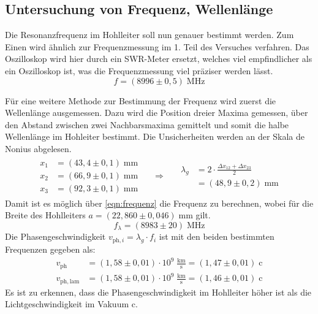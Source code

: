 \subsection{Untersuchung von Frequenz, Wellenlänge}
\label{sec:wellenlaenge}
    Die Resonanzfrequenz im Hohlleiter soll nun genauer bestimmt werden.
    Zum Einen wird ähnlich zur Frequenzmessung im 1. Teil des Versuches verfahren.
    Das Oszilloskop wird hier durch ein SWR-Meter ersetzt, welches viel empfindlicher als ein Oszilloskop ist, was die Frequenzmessung viel präziser werden lässt.
    \begin{equation*}
        f = (8996 \pm 0,5) \; \mathrm{MHz}
    \end{equation*}

    Für eine weitere Methode zur Bestimmung der Frequenz wird zuerst die Wellenlänge ausgemessen.
    Dazu wird die Position dreier Maxima gemessen, über den Abstand zwischen zwei Nachbarsmaxima gemittelt und somit die halbe Wellenlänge im Hohleiter bestimmt. Die Unsicherheiten werden an der Skala de Nonius abgelesen.
    \begin{align*}
        \begin{aligned}
            x_1 &= (43,4 \pm 0,1)\;\mathrm{mm} \\
            x_2 &= (66,9 \pm 0,1)\;\mathrm{mm} \\
            x_3 &= (92,3 \pm 0,1)\;\mathrm{mm}
        \end{aligned}
        && \Rightarrow && 
        \begin{aligned}
            \lambda_g &= 2 \cdot \frac{\Delta x_{12} + \Delta x_{23}}{2} \\
            &= (48,9 \pm 0,2)\; \mathrm{mm}
        \end{aligned}
    \end{align*}
    Damit ist es möglich über \autoref{eqn:frequenz} die Frequenz zu berechnen, wobei für die Breite des Hohlleiters $a = (22,860 \pm 0,046) \;$mm gilt.
    \begin{equation*}
        f_{\lambda} = (8983 \pm 20) \; \mathrm{MHz}
    \end{equation*}
    Die Phasengeschwindigkeit $v_{\mathrm{ph,}i} = \lambda_g \cdot f_i$ ist mit den beiden bestimmten Frequenzen gegeben als:
    \begin{align*}
        v_{\mathrm{ph}} &= (1,58 \pm 0,01) \cdot 10^{9} \; \frac{\mathrm{km}}{\mathrm{s}} = (1,47 \pm 0,01) \; \mathrm{c} \\
        v_{\mathrm{ph,lam}} &= (1,58 \pm 0,01) \cdot 10^{9} \; \frac{\mathrm{km}}{\mathrm{s}} = (1,46 \pm 0,01) \; \mathrm{c}
    \end{align*}
    Es ist zu erkennen, dass die Phasengeschwindigkeit im Hohlleiter höher ist als die Lichtgeschwindigkeit im Vakuum c.

